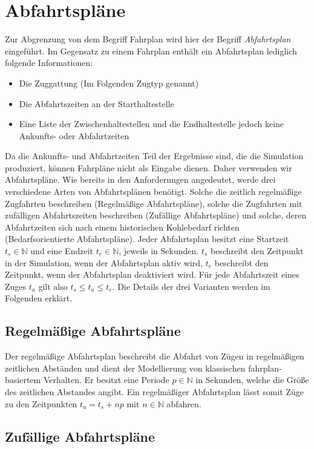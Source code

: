 \section{Abfahrtspläne}

Zur Abgrenzung von dem Begriff Fahrplan wird hier der Begriff \emph{Abfahrtsplan} eingeführt. Im Gegensatz zu einem Fahrplan enthält ein Abfahrtsplan lediglich folgende Informationen:
\begin{itemize}
    \item Die Zuggattung (Im Folgenden Zugtyp genannt)
    \item Die Abfahrtszeiten an der Starthaltestelle
    \item Eine Liste der Zwischenhaltestellen und die Endhaltestelle jedoch keine Ankunfts- oder Abfahrtzeiten
\end{itemize}
Da die Ankunfts- und Abfahrtzeiten Teil der Ergebnisse sind, die die Simulation produziert, können Fahrpläne nicht als Eingabe dienen. Daher verwenden wir Abfahrtspläne. Wie bereits in den Anforderungen angedeutet, werde drei verschiedene Arten von Abfahrtsplänen benötigt. Solche die zeitlich regelmäßige Zugfahrten beschreiben (Regelmäßige Abfahrtspläne), solche die Zugfahrten mit zufälligen Abfahrtszeiten beschreiben (Zufällige Abfahrtspläne) und solche, deren Abfahrtzeiten sich nach einem historischen Kohlebedarf richten (Bedarfsorientierte Abfahrtspläne). Jeder Abfahrtsplan besitzt eine Startzeit $t_s \in \mathbb{N}$ und eine Endzeit $t_e \in \mathbb{N}$, jeweils in Sekunden. $t_s$ beschreibt den Zeitpunkt in der Simulation, wenn der Abfahrtsplan aktiv wird, $t_e$ beschreibt den Zeitpunkt, wenn der Abfahrtsplan deaktiviert wird. Für jede Abfahrtszeit eines Zuges $t_a$ gilt also $t_s\leq t_a \leq t_e$. Die Details der drei Varianten werden im Folgenden erklärt.

\subsection{Regelmäßige Abfahrtspläne}

Der regelmäßige Abfahrtsplan beschreibt die Abfahrt von Zügen in regelmäßigen zeitlichen Abständen und dient der Modellierung von klassischen fahrplan-basiertem Verhalten. Er besitzt eine Periode $p\in\mathbb{N}$ in Sekunden, welche die Größe des zeitlichen Abstandes angibt. Ein regelmäßiger Abfahrtsplan lässt somit Züge zu den Zeitpunkten $t_a=t_s+np$ mit $n\in\mathbb{N}$ abfahren.

\subsection{Zufällige Abfahrtspläne}

